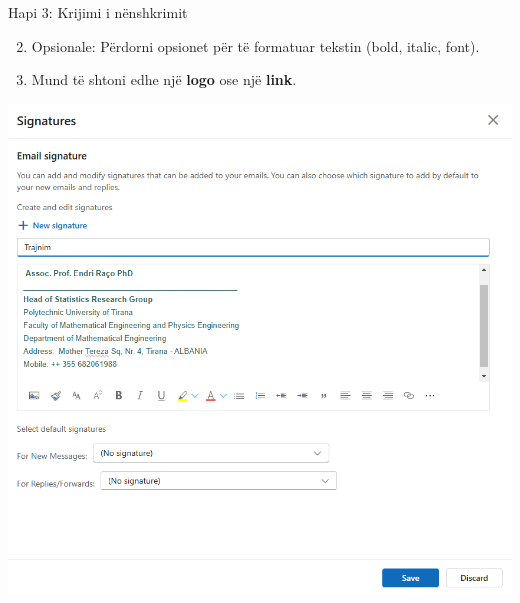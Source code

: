 \documentclass[
  ignorenonframetext,
]{beamer}
\begin{document}
\begin{frame}{Hapi 3: Krijimi i nënshkrimit}
\label{hapi-3-krijimi-i-nuxebnshkrimit-1}
\begin{enumerate}
\setcounter{enumi}{1}
\item
  Opsionale: Përdorni opsionet për të formatuar tekstin (bold, italic,
  font).
\item
  Mund të shtoni edhe një \textbf{logo} ose një \textbf{link}.
\end{enumerate}

\includegraphics{./images/outlook8.png}
\end{frame}
\end{document}
